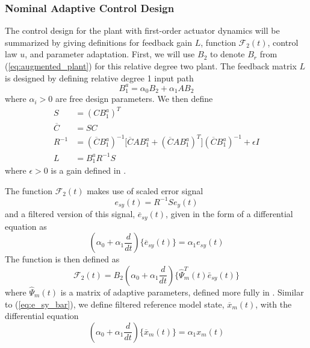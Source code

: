 \documentclass[english]{ifacconf}
\begin{document}
\subsubsection{Nominal Adaptive Control Design}
The control design for the plant with first-order actuator dynamics will be summarized by giving definitions for feedback gain $L$, function $\mathcal{F}_2(t)$, control law $u$, and parameter adaptation. First, we will use $B_2$ to denote $B_r$ from (\ref{eq:augmented_plant}) for this relative degree two plant. The feedback matrix $L$ is designed by defining relative degree 1 input path
\begin{equation}
B_1^a = \alpha_0 B_2 + \alpha_1 A B_2 \label{eq:rd2-b1a}
\end{equation}
where $\alpha_i > 0$ are free design parameters. We then define
\begin{align}
S &= (C B_1^a)^T \label{eq:S}\\	\overline{C} & = S C\\ R^{-1} &= (\overline{C} B_1^a)^{-1} \big[ \overline{C} A B_1^a + (\overline{C} A B_1^a)^T\big] (\overline{C} B_1^a)^{-1} + \epsilon I \\ L & = B_1^a R^{-1} S \label{eq:L}
\end{align}
where $\epsilon > 0$ is a gain defined in \cite[Eq. 30]{qu2015adaptive}. 

The function $\mathcal{F}_2(t)$ makes use of scaled error signal
\begin{equation}
	e_{sy}(t) = R^{-1} S e_y(t) \label{eq:esy}
\end{equation}
and a filtered version of this signal, $\overline{e}_{sy}(t)$, given in the form of a differential equation as
\begin{equation}
(\alpha_0 + \alpha_1 \frac{d}{dt}) \big\{ \overline{e}_{sy}(t) \big\} = \alpha_1 e_{sy}(t) \label{eq:e_sy_bar}
\end{equation}
The function is then defined as
\begin{equation}
\mathcal{F}_2(t) = B_2 (\alpha_0 + \alpha_1 \frac{d}{dt})\big\{ \hat{\Psi}_m^T (t) \bar{e}_{sy}(t) \big\}
\end{equation}
where $\hat{\Psi}_m(t)$ is a matrix of adaptive parameters, defined more fully in \cite{qu2016adaptive}. Similar to (\ref{eq:e_sy_bar}), we define filtered reference model state, $\overline{x}_m(t)$, with the differential equation
\begin{equation}
(\alpha_0 + \alpha_1 \frac{d}{dt}) \big\{ \overline{x}_{m}(t) \big\} = \alpha_1 x_{m}(t) \label{eq:xm_bar}
\end{equation}
\end{document}
